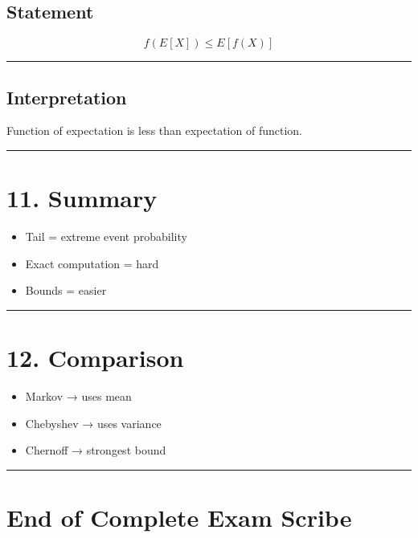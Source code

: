 \documentclass[12pt]{article}
\begin{document}
\subsection*{Statement}

\[
f(E[X]) \leq E[f(X)]
\]

\hrule

\subsection*{Interpretation}

Function of expectation is less than expectation of function.

\hrule

\section*{11. Summary}

\begin{itemize}
\item Tail = extreme event probability
\item Exact computation = hard
\item Bounds = easier
\end{itemize}

\hrule

\section*{12. Comparison}

\begin{itemize}
\item Markov → uses mean
\item Chebyshev → uses variance
\item Chernoff → strongest bound
\end{itemize}

\hrule

\section*{End of Complete Exam Scribe}
\end{document}
